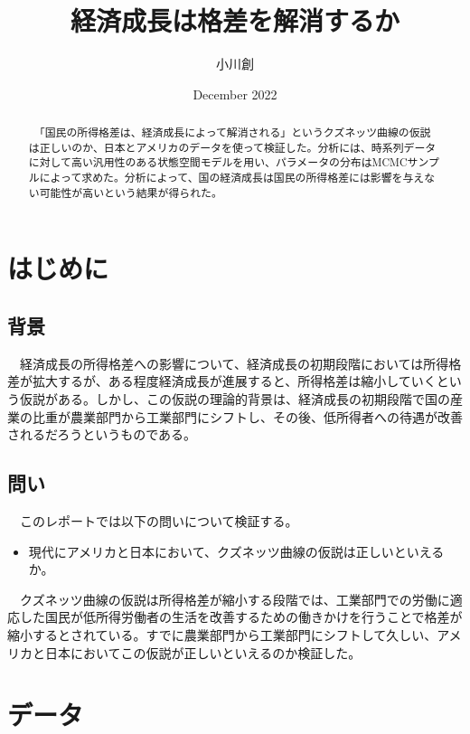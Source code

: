 \documentclass{bxjsarticle}
\title{経済成長は格差を解消するか}
\author{小川創}
\date{December 2022}
\begin{document}
\maketitle
\begin{abstract}
   　「国民の所得格差は、経済成長によって解消される」というクズネッツ曲線の仮説は正しいのか、日本とアメリカのデータを使って検証した。分析には、時系列データに対して高い汎用性のある状態空間モデルを用い、パラメータの分布はMCMCサンプルによって求めた。分析によって、国の経済成長は国民の所得格差には影響を与えない可能性が高いという結果が得られた。
\end{abstract}

\newpage


\section{はじめに}
\subsection{背景}
　経済成長の所得格差への影響について、経済成長の初期段階においては所得格差が拡大するが、ある程度経済成長が進展すると、所得格差は縮小していくという仮説がある。しかし、この仮説の理論的背景は、経済成長の初期段階で国の産業の比重が農業部門から工業部門にシフトし、その後、低所得者への待遇が改善されるだろうというものである。
\subsection{問い}
　このレポートでは以下の問いについて検証する。
\begin{itemize}
    \item 現代にアメリカと日本において、クズネッツ曲線の仮説は正しいといえるか。
\end{itemize}
　クズネッツ曲線の仮説は所得格差が縮小する段階では、工業部門での労働に適応した国民が低所得労働者の生活を改善するための働きかけを行うことで格差が縮小するとされている。すでに農業部門から工業部門にシフトして久しい、アメリカと日本においてこの仮説が正しいといえるのか検証した。

\section{データ}
\end{document}
